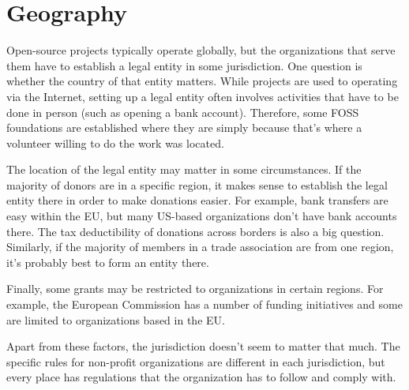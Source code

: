 


\chapter{Geography}

Open-source projects typically operate globally, but the organizations that serve them have to establish a legal entity in some jurisdiction.  One question is whether the country of that entity matters.  While projects are used to operating via the Internet, setting up a legal entity often involves activities that have to be done in person (such as opening a bank account).  Therefore, some FOSS foundations are established where they are simply because that's where a volunteer willing to do the work was located.

The location of the legal entity may matter in some circumstances.  If the majority of donors are in a specific region, it makes sense to establish the legal entity there in order to make donations easier.  For example, bank transfers are easy within the EU, but many US-based organizations don't have bank accounts there.  The tax deductibility of donations across borders is also a big question.  Similarly, if the majority of members in a trade association are from one region, it's probably best to form an entity there.

Finally, some grants may be restricted to organizations in certain regions.  For example, the European Commission has a number of funding initiatives and some are limited to organizations based in the EU.

Apart from these factors, the jurisdiction doesn't seem to matter that much.  The specific rules for non-profit organizations are different in each jurisdiction, but every place has regulations that the organization has to follow and comply with.

\newpage

